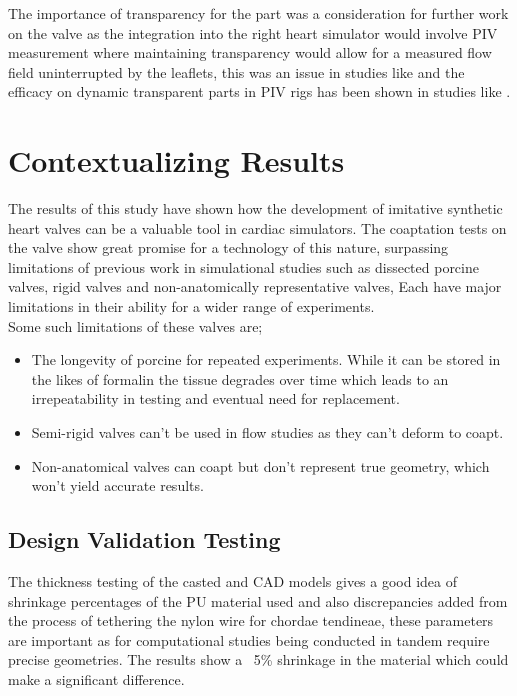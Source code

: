 The importance of transparency for the part was a consideration for further work on the valve as the integration into the right heart simulator would involve \gls{PIV} measurement where maintaining transparency would allow for a measured flow field uninterrupted by the leaflets, this was an issue in studies like  and the efficacy on dynamic transparent parts in \gls{PIV} rigs has been shown in studies like .

\section{Contextualizing Results}


The results of this study have shown how the development of imitative synthetic heart valves can be a valuable tool in cardiac simulators. The coaptation tests on the valve show great promise for a technology of this nature, surpassing limitations of previous work in simulational studies such as  dissected porcine valves,  rigid valves and  non-anatomically representative valves, Each have major limitations in their ability for a wider range of experiments.\\
Some such limitations of these valves are;
\begin{itemize}
    \item The longevity of porcine for repeated experiments. While it can be stored in the likes of formalin the tissue degrades over time which leads to an irrepeatability in testing and eventual need for replacement.
    \item Semi-rigid valves can't be used in flow studies as they can't deform to coapt.
    \item Non-anatomical valves can coapt but don't represent true geometry, which won't yield accurate results.
\end{itemize}
\subsection{Design Validation Testing}
The thickness testing of the casted and \gls{CAD} models gives a good idea of shrinkage percentages of the \gls{PU} material used and also discrepancies added from the process of tethering the nylon wire for chordae tendineae, these parameters are important as for computational studies being conducted in tandem require precise geometries. The results show a ~5\% shrinkage in the material which could make a significant difference.

